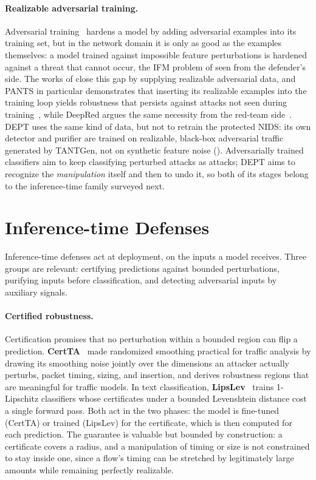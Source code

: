 \paragraph{Realizable adversarial training.}
Adversarial training~\cite{madry2018towards} hardens a model by adding adversarial
examples into its training set, but in the network domain it is only as good as the
examples themselves: a model trained against impossible feature perturbations is
hardened against a threat that cannot occur, the \ac{IFM} problem of
 seen from the defender's side. The works of
 close this gap by supplying realizable adversarial data, and
PANTS in particular demonstrates that inserting its realizable examples into the
training loop yields robustness that persists against attacks not seen during
training~\cite{jin2025robustifying}, while DeepRed argues the same necessity from the
red-team side~\cite{hajizadeh2025deepred}. DEPT uses the same kind of data, but not to
retrain the protected \ac{NIDS}: its own detector and purifier are trained on realizable,
black-box adversarial traffic generated by TANTGen, not on synthetic feature noise
(). Adversarially trained classifiers aim to keep classifying
perturbed attacks as attacks; DEPT aims to recognize the \emph{manipulation} itself and
then to undo it, so both of its stages belong to the inference-time family surveyed next.

\section{Inference-time Defenses}\label{sec:rel-inference}
Inference-time defenses act at deployment, on the inputs a model receives. Three
groups are relevant: certifying predictions against bounded perturbations, purifying
inputs before classification, and detecting adversarial inputs by auxiliary signals.

\paragraph{Certified robustness.}
Certification promises that no perturbation within a bounded region can flip a
prediction. \textbf{CertTA}~\cite{yan2025certta} made randomized smoothing practical
for traffic analysis by drawing its smoothing noise jointly over the dimensions an
attacker actually perturbs, packet timing, sizing, and insertion, and derives
robustness regions that are meaningful for traffic models. In text classification,
\textbf{LipsLev}~\cite{abad2025lipslev} trains 1-Lipschitz classifiers whose certificates
under a bounded Levenshtein distance cost a single forward pass. Both act in the two
phases: the model is fine-tuned (CertTA) or trained (LipsLev) for the certificate, which
is then computed for each prediction. The guarantee is valuable but bounded by
construction: a certificate covers a radius, and a manipulation of timing or size is not
constrained to stay inside one, since a flow's timing can be stretched by legitimately
large amounts while remaining perfectly realizable.

